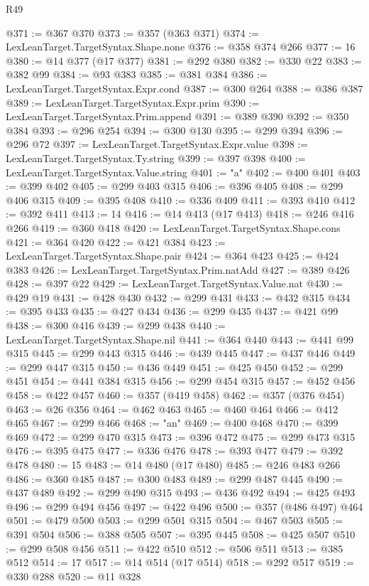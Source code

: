 \begin{lexlean}{R49}
\begin{coremodule}
@371 := @367 @370
@373 := @357 (@363 @371)
@374 := LexLeanTarget.TargetSyntax.Shape.none
@376 := @358 @374 @266
@377 := 16
@380 := @14 @377 (@17 @377)
@381 := @292 @380
@382 := @330 @22
@383 := @382 @99
@384 := @93 @383
@385 := @381 @384
@386 := LexLeanTarget.TargetSyntax.Expr.cond
@387 := @300 @264
@388 := @386 @387
@389 := LexLeanTarget.TargetSyntax.Expr.prim
@390 := LexLeanTarget.TargetSyntax.Prim.append
@391 := @389 @390
@392 := @350 @384
@393 := @296 @254
@394 := @300 @130
@395 := @299 @394
@396 := @296 @72
@397 := LexLeanTarget.TargetSyntax.Expr.value
@398 := LexLeanTarget.TargetSyntax.Ty.string
@399 := @397 @398
@400 := LexLeanTarget.TargetSyntax.Value.string
@401 := "a"
@402 := @400 @401
@403 := @399 @402
@405 := @299 @403 @315
@406 := @396 @405
@408 := @299 @406 @315
@409 := @395 @408
@410 := @336 @409
@411 := @393 @410
@412 := @392 @411
@413 := 14
@416 := @14 @413 (@17 @413)
@418 := @246 @416 @266
@419 := @360 @418
@420 := LexLeanTarget.TargetSyntax.Shape.cons
@421 := @364 @420
@422 := @421 @384
@423 := LexLeanTarget.TargetSyntax.Shape.pair
@424 := @364 @423
@425 := @424 @383
@426 := LexLeanTarget.TargetSyntax.Prim.natAdd
@427 := @389 @426
@428 := @397 @22
@429 := LexLeanTarget.TargetSyntax.Value.nat
@430 := @429 @19
@431 := @428 @430
@432 := @299 @431
@433 := @432 @315
@434 := @395 @433
@435 := @427 @434
@436 := @299 @435
@437 := @421 @99
@438 := @300 @416
@439 := @299 @438
@440 := LexLeanTarget.TargetSyntax.Shape.nil
@441 := @364 @440
@443 := @441 @99 @315
@445 := @299 @443 @315
@446 := @439 @445
@447 := @437 @446
@449 := @299 @447 @315
@450 := @436 @449
@451 := @425 @450
@452 := @299 @451
@454 := @441 @384 @315
@456 := @299 @454 @315
@457 := @452 @456
@458 := @422 @457
@460 := @357 (@419 @458)
@462 := @357 (@376 @454)
@463 := @26 @356
@464 := @462 @463
@465 := @460 @464
@466 := @412 @465
@467 := @299 @466
@468 := "an"
@469 := @400 @468
@470 := @399 @469
@472 := @299 @470 @315
@473 := @396 @472
@475 := @299 @473 @315
@476 := @395 @475
@477 := @336 @476
@478 := @393 @477
@479 := @392 @478
@480 := 15
@483 := @14 @480 (@17 @480)
@485 := @246 @483 @266
@486 := @360 @485
@487 := @300 @483
@489 := @299 @487 @445
@490 := @437 @489
@492 := @299 @490 @315
@493 := @436 @492
@494 := @425 @493
@496 := @299 @494 @456
@497 := @422 @496
@500 := @357 (@486 @497) @464
@501 := @479 @500
@503 := @299 @501 @315
@504 := @467 @503
@505 := @391 @504
@506 := @388 @505
@507 := @395 @445
@508 := @425 @507
@510 := @299 @508 @456
@511 := @422 @510
@512 := @506 @511
@513 := @385 @512
@514 := 17
@517 := @14 @514 (@17 @514)
@518 := @292 @517
@519 := @330 @288
@520 := @11 @328

\end{coremodule}
\end{lexlean}
